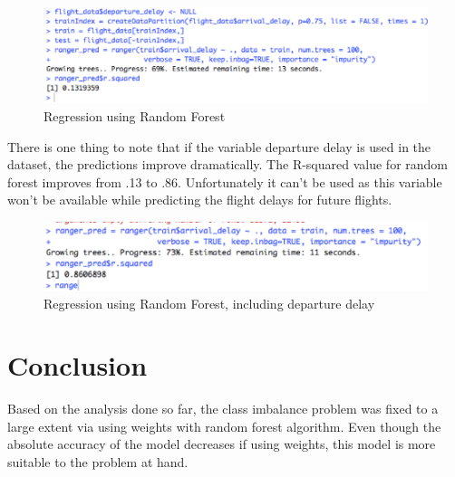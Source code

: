 \begin{figure}[h]
    \centering
    \includegraphics[width=\textwidth]{Figures/regression_rf_no_departure.png}
    \caption{Regression using Random Forest}
    \label{fig:regression_rf_no_departure}
\end{figure}

There is one thing to note that if the variable departure delay is used in the dataset, the predictions improve dramatically. The R-squared value for random forest improves from .13 to .86. Unfortunately it can't be used as this variable won't be available while predicting the flight delays for future flights.

\begin{figure}[h]
    \centering
    \includegraphics[width=\textwidth]{Figures/regression_rf.png}
    \caption{Regression using Random Forest, including departure delay}
    \label{fig:regression_rf}
\end{figure}


\section{Conclusion}
Based on the analysis done so far, the class imbalance problem was fixed to a large extent via using weights with random forest algorithm. Even though the absolute accuracy of the model decreases if using weights, this model is more suitable to the problem at hand.